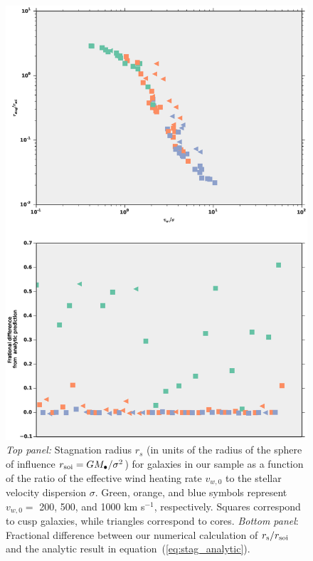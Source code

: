 \documentclass[usenatbib,fleqn]{mn2e}
\begin{document}
\begin{figure}
  \includegraphics[width=\columnwidth]{rs.eps}
  \caption{\label{fig:stag} \emph{Top panel:} Stagnation radius $r_{s}$ (in units of the radius of the sphere of influence $r_{\rm soi} = GM_{\bullet}/\sigma^{2}$) for galaxies in our sample as a function of the ratio of the effective wind heating rate $v_{w,0}$ to the stellar velocity dispersion $\sigma$.  Green, orange, and blue symbols represent $v_{w,0} =$ 200, 500, and 1000 km s$^{-1}$, respectively.  Squares correspond to cusp galaxies, while triangles correspond to cores. \emph{Bottom panel}: Fractional difference between our numerical calculation of $r_{\rm s}/r_{\rm soi}$ and the analytic result in equation~(\ref{eq:stag_analytic}). }
\end{figure}
\end{document}
